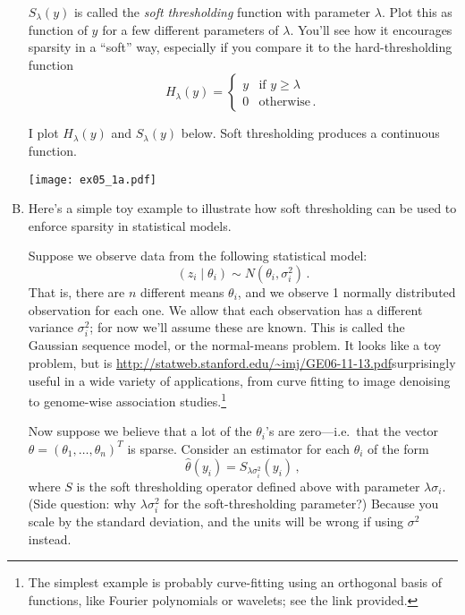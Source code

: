 \documentclass{article}
\begin{document}
\begin{enumerate}[(A)]
$S_\lambda(y)$ is called the \textit{soft thresholding} function with parameter $\lambda$.  Plot this as function of $y$ for a few different parameters of $\lambda$.  You'll see how it encourages sparsity in a ``soft'' way, especially if you compare it to the hard-thresholding function
$$
H_{\lambda}(y) = 
\left \{
\begin{array}{ll}
y & \mbox{if $y \geq \lambda$} \\
0 & \mbox{otherwise} \, .
\end{array}
\right.
$$


\color{blue}
I plot $H_\lambda(y)$ and $S_\lambda(y)$ below. Soft thresholding produces a continuous function. 
\begin{center}
\texttt{[image: ex05\_1a.pdf]}
\end{center}
\color{black}

\item Here's a simple toy example to illustrate how soft thresholding can be used to enforce sparsity in statistical models.

Suppose we observe data from the following statistical model:
$$
(z_{i} \mid \theta_i) \sim N(\theta_i, \sigma^2_i) \, .
$$
That is, there are $n$ different means $\theta_i$, and we observe 1 normally distributed observation for each one.  We allow that each observation has a different variance $\sigma^2_i$; for now we'll assume these are known.  This is called the Gaussian sequence model, or the normal-means problem.  It looks like a toy problem, but is \url{http://statweb.stanford.edu/~imj/GE06-11-13.pdf}{surprisingly useful} in a wide variety of applications, from curve fitting to image denoising to genome-wise association studies.\footnote{The simplest example is probably curve-fitting using an orthogonal basis of functions, like Fourier polynomials or wavelets; see the link provided.}

Now suppose we believe that a lot of the $\theta_i$'s are zero---i.e.~that the vector $\theta = (\theta_1, \ldots, \theta_n)^T$ is sparse.  Consider an estimator for each $\theta_i$ of the form
$$
\widehat{\theta}(y_i) = S_{\lambda \sigma_i^2}(y_i) \, ,
$$
where $S$ is the soft thresholding operator defined above with parameter $\lambda \sigma_i$.  (Side question: why $\lambda \sigma_i^2$ for the soft-thresholding parameter?) \color{blue} Because you scale by the standard deviation, and the units will be wrong if using $\sigma^2$ instead. \color{black}


\end{enumerate}
\end{document}
